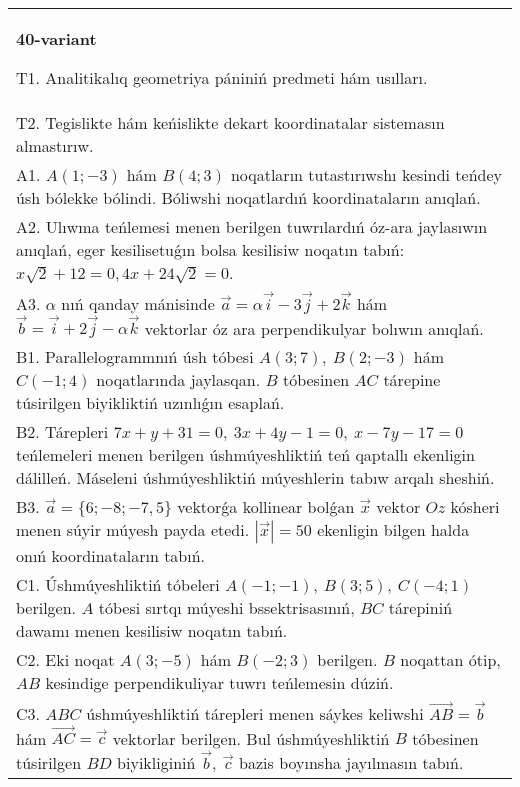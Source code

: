 \documentclass{article}
\begin{document}
\begin{tabular}{m{17cm}}
\textbf{40-variant}
\newline

T1. Analitikalıq geometriya pániniń predmeti hám usılları. 
 \\
T2. Tegislikte hám keńislikte dekart koordinatalar sistemasın almastırıw. 
 \\
A1. 
$A(1;-3)$ hám $B(4;3)$ noqatların tutastırıwshı
kesindi teńdey úsh bólekke bólindi. Bóliwshi noqatlardıń koordinataların
anıqlań.
 \\
A2. 
Ulıwma teńlemesi menen berilgen tuwrılardıń
óz-ara jaylasıwın anıqlań, eger kesilisetuǵın bolsa kesilisiw noqatın
tabıń: $x\sqrt{2}+12=0, 4x+24\sqrt{2}=0$.
 \\
A3. 
$\alpha$
nıń qanday mánisinde
$\overrightarrow{a} = \alpha\overrightarrow{i} - 3\overrightarrow{j} + 2\overrightarrow{k}$
hám
$\overrightarrow{b} = \overrightarrow{i} + 2\overrightarrow{j} - \alpha\overrightarrow{k}$
vektorlar óz ara perpendikulyar bolıwın anıqlań. 
 \\
B1. 
Parallelogrammnıń úsh tóbesi \(A(3;7),\ B(2;-3)\) hám
\(C(-1;4)\) noqatlarında jaylasqan. $B$ tóbesinen $AC$
tárepine túsirilgen biyikliktiń uzınlıǵın esaplań.
 \\
B2. 
Tárepleri
\(7x+y+31=0,\ 3x+4y-1=0,\ x-7y-17=0\) teńlemeleri
menen berilgen úshmúyeshliktiń teń qaptallı ekenligin dálilleń. 
Máseleni úshmúyeshliktiń
múyeshlerin tabıw arqalı sheshiń.
 \\
B3. 
$\vec{a} = \{ 6; - 8; - 7,5\}$ vektorǵa kollinear bolǵan $\vec{x}$ vektor $Oz$ kósheri menen súyir múyesh payda etedi. $|\vec{x}| = 50$ ekenligin bilgen halda onıń koordinataların tabıń.
 \\
C1. 
Úshmúyeshliktiń tóbeleri
\(A( - 1; - 1),\ B(3;5),\ C( - 4;1)\) berilgen. $A$ tóbesi sırtqı
múyeshi bssektrisasınıń, $BC$ tárepiniń dawamı menen kesilisiw
noqatın tabıń.
 \\
C2. 
Eki noqat \(A(3; - 5)\) hám \(B( - 2;3)\) berilgen.
$B$ noqattan ótip, $AB$ kesindige perpendikuliyar tuwrı
teńlemesin dúziń.
 \\
C3. 
\(ABC\) úshmúyeshliktiń tárepleri menen sáykes keliwshi \(\vec{AB} = \vec{b}\) hám \(\vec{AC} = \vec{c}\) vektorlar berilgen. Bul úshmúyeshliktiń \(B\) tóbesinen túsirilgen \(BD\) biyikliginiń \(\vec{b},\ \vec{c}\) bazis boyınsha jayılmasın tabıń.
 \\

\end{tabular}
\vspace{1cm}
\end{document}
